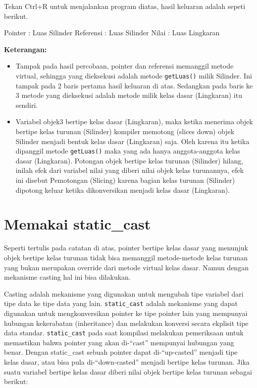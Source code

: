 Tekan Ctrl+R untuk menjalankan program diatas, hasil keluaran adalah
sepeti berikut.

\begin{lcverbatim}
Pointer : Luas Silinder
Referensi : Luas Silinder
Nilai : Luas Lingkaran
\end{lcverbatim}

\textbf{Keterangan:}

\begin{itemize}

\item
  Tampak pada hasil percobaan, pointer dan referensi memanggil metode
  virtual, sehingga yang dieksekusi adalah metode \texttt{getLuas()}
  milik Silinder. Ini tampak pada 2 baris pertama hasil keluaran di
  atas. Sedangkan pada baris ke 3 metode yang dieksekusi adalah metode
  milik kelas dasar (Lingkaran) itu sendiri.
\item
  Variabel objek3 bertipe kelas dasar (Lingkaran), maka ketika menerima
  objek bertipe kelas turunan (Silinder) kompiler memotong (slices down)
  objek Silinder menjadi bentuk kelas dasar (Lingkaran) saja. Oleh
  karena itu ketika dipanggil metode \texttt{getLuas()} maka yang ada
  hanya anggota-anggota kelas dasar (Lingkaran). Potongan objek bertipe
  kelas turunan (Silinder) hilang, inilah efek dari variabel nilai yang
  diberi nilai objek kelas turunannya, efek ini disebut Pemotongan
  (Slicing) karena bagian kelas turunan (Silinder) dipotong keluar
  ketika dikonversikan menjadi kelas dasar (Lingkaran).
\end{itemize}

\section{Memakai static\_cast}\label{memakai-staticux5fcast}

Seperti tertulis pada catatan di atas, pointer bertipe kelas dasar yang
menunjuk objek bertipe kelas turunan tidak bisa memanggil metode-metode
kelas turunan yang bukan merupakan override dari metode virtual kelas
dasar. Namun dengan mekanisme casting hal ini bisa dilakukan.

Casting adalah mekanisme yang digunakan untuk mengubah tipe variabel
dari tipe data ke tipe data yang lain. \texttt{static\_cast} adalah
mekanisme yang dapat digunakan untuk mengkonversikan pointer ke tipe
pointer lain yang mempunyai hubungan kekerabatan (inheritance) dan
melakukan konversi secara ekplisit tipe data standar.
\texttt{static\_cast} pada saat kompilasi melakukan pemeriksaan untuk
memastikan bahwa pointer yang akan di-``cast'' mempunyai hubungan yang
benar. Dengan static\_cast sebuah pointer dapat di-``up-casted'' menjadi
tipe kelas dasar, atau bisa pula di-``down-casted'' menjadi bertipe
kelas turunan. Jika suatu variabel bertipe kelas dasar diberi nilai
objek bertipe kelas turunan sebagai berikut:

